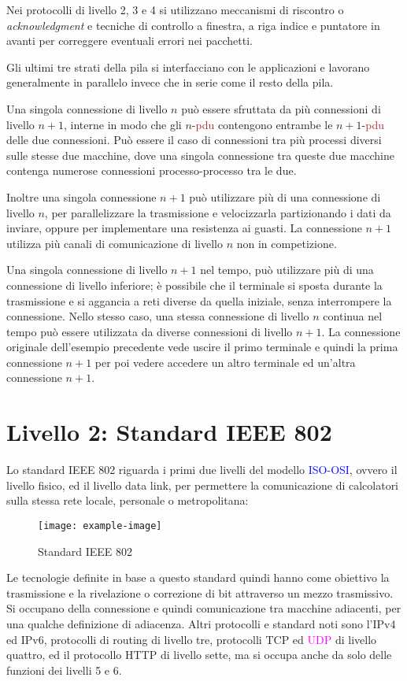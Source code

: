 \documentclass{article}
\numberwithin{equation}{subsection}
\begin{document}
Nei protocolli di livello 2, 3 e 4 si utilizzano meccanismi di riscontro o \textit{acknowledgment} e tecniche di controllo a finestra, a riga indice e puntatore in avanti per 
correggere eventuali errori nei pacchetti. 

Gli ultimi tre strati della pila si interfacciano con le applicazioni e lavorano generalmente in parallelo invece che in serie come il resto della pila. 

Una singola connessione di livello $n$ può essere sfruttata da più connessioni di livello $n+1$, interne in modo che gli $n$-\textcolor{Brown}{pdu} contengono entrambe le $n+1$-\textcolor{Brown}{pdu} delle due 
connessioni. Può essere il caso di connessioni tra più processi diversi sulle stesse due macchine, dove una singola connessione tra queste due macchine contenga numerose 
connessioni processo-processo tra le due. 

Inoltre una singola connessione $n+1$ può utilizzare più di una connessione di livello $n$, per parallelizzare la trasmissione e velocizzarla partizionando i dati da 
inviare, oppure per implementare una resistenza ai guasti. La connessione $n+1$ utilizza più canali di comunicazione di livello $n$ non in competizione. 

Una singola connessione di livello $n+1$ nel tempo, può utilizzare più di una connessione di livello inferiore; è possibile che il terminale si sposta durante la 
trasmissione e si aggancia a reti diverse da quella iniziale, senza interrompere la connessione. 
Nello stesso caso, una stessa connessione di livello $n$ continua nel tempo può essere utilizzata da diverse connessioni di livello $n+1$. La connessione originale dell'esempio 
precedente vede uscire il primo terminale e quindi la prima connessione $n+1$ per poi vedere accedere un altro terminale ed un'altra connessione $n+1$. 

\clearpage

\section{Livello 2: Standard IEEE 802}

Lo standard IEEE 802 riguarda i primi due livelli del modello \textcolor{blue}{ISO-OSI}, ovvero il livello fisico, ed il livello data link, per permettere la comunicazione di calcolatori sulla stessa rete locale, personale o metropolitana:
\begin{figure}[H]%
    \centering%
    \texttt{[image: example-image]}%
    \caption{Standard IEEE 802}%
\end{figure}
Le tecnologie definite in base a questo standard quindi hanno come obiettivo la trasmissione 
e la rivelazione o correzione di bit attraverso un mezzo trasmissivo. Si occupano della connessione e quindi comunicazione tra macchine adiacenti, per una qualche definizione di adiacenza. Altri protocolli e standard 
noti sono l'\textcolor{BurntOrange}{IPv4} ed \textcolor{OliveGreen}{IPv6}, protocolli di routing di livello tre, protocolli \textcolor{Bittersweet}{TCP} ed \textcolor{Fuchsia}{UDP} di livello quattro, ed il protocollo \textcolor{NavyBlue}{HTTP} di livello sette, ma si occupa anche da solo delle funzioni dei livelli 5 e 6. 
\end{document}
